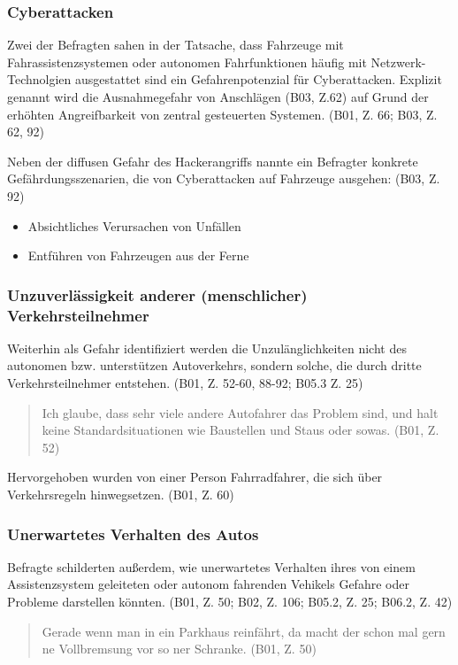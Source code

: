 \documentclass[12pt]{article}
\begin{document}
\subsubsection*{Cyberattacken}
Zwei der Befragten sahen in der Tatsache, dass Fahrzeuge mit Fahrassistenzsystemen oder autonomen Fahrfunktionen häufig mit Netzwerk-Technolgien ausgestattet sind ein Gefahrenpotenzial für Cyberattacken. Explizit genannt wird die \glqq Ausnahmegefahr von Anschlägen\grqq{} (B03, Z.62) auf Grund der erhöhten Angreifbarkeit von zentral gesteuerten Systemen. (B01, Z. 66; B03, Z. 62, 92)

Neben der diffusen Gefahr des Hackerangriffs nannte ein Befragter konkrete Gefährdungsszenarien, die von Cyberattacken auf Fahrzeuge ausgehen: (B03, Z. 92)
\begin{itemize}
  \item Absichtliches Verursachen von Unfällen
  \item Entführen von Fahrzeugen aus der Ferne
\end{itemize}

\subsubsection*{Unzuverlässigkeit anderer (menschlicher) Verkehrsteilnehmer}
Weiterhin als Gefahr identifiziert werden die Unzulänglichkeiten nicht des autonomen bzw. unterstützen Autoverkehrs, sondern solche, die durch dritte Verkehrsteilnehmer entstehen. (B01, Z. 52-60, 88-92; B05.3 Z. 25)

\begin{quote}
  Ich glaube, dass sehr viele andere Autofahrer das Problem sind, und halt keine Standardsituationen wie Baustellen und Staus oder sowas. (B01, Z. 52)
\end{quote}

Hervorgehoben wurden von einer Person Fahrradfahrer, die sich über Verkehrsregeln hinwegsetzen. (B01, Z. 60)

\subsubsection*{Unerwartetes Verhalten des Autos}
Befragte schilderten außerdem, wie unerwartetes Verhalten ihres von einem Assistenzsystem geleiteten oder autonom fahrenden Vehikels Gefahre oder Probleme darstellen könnten. (B01, Z. 50; B02, Z. 106; B05.2, Z. 25; B06.2, Z. 42)

\begin{quote}
  Gerade wenn man in ein Parkhaus reinfährt, da macht der schon mal gern ne Vollbremsung vor so ner Schranke. (B01, Z. 50)
\end{quote}
\end{document}
